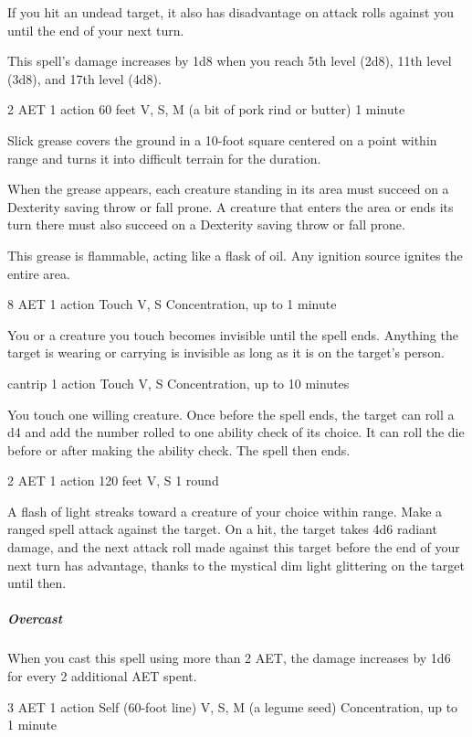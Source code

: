 If you hit an undead target, it also has disadvantage on attack rolls against you until the end of your next turn.

This spell's damage increases by 1d8 when you reach 5th level (2d8), 11th level (3d8), and 17th level (4d8).


{2 AET}
{1 action}
{60 feet}
{V, S, M (a bit of pork rind or butter)}
{1 minute}

Slick grease covers the ground in a 10-foot square centered on a point within range and turns it into difficult terrain for the duration.

When the grease appears, each creature standing in its area must succeed on a Dexterity saving throw or fall prone. A creature that enters the area or ends its turn there must also succeed on a Dexterity saving throw or fall prone.

This grease is flammable, acting like a flask of oil. Any ignition source ignites the entire area.


{8 AET}
{1 action}
{Touch}
{V, S}
{Concentration, up to 1 minute}

You or a creature you touch becomes invisible until the spell ends. Anything the target is wearing or carrying is invisible as long as it is on the target's person.

{cantrip}
{1 action}
{Touch}
{V, S}
{Concentration, up to 10 minutes}

You touch one willing creature. Once before the spell ends, the target can roll a d4 and add the number rolled to one ability check of its choice. It can roll the die before or after making the ability check. The spell then ends. 

{2 AET}
{1 action}
{120 feet}
{V, S}
{1 round}

A flash of light streaks toward a creature of your choice within range. Make a ranged spell attack against the target. On a hit, the target takes 4d6 radiant damage, and the next attack roll made against this target before the end of your next turn has advantage, thanks to the mystical dim light glittering on the target until then.

\subparagraph*{Overcast} When you cast this spell using more than 2 AET, the damage increases by 1d6 for every 2 additional AET spent.

{3 AET}
{1 action}
{Self (60-foot line)}
{V, S, M (a legume seed)}
{Concentration, up to 1 minute}

